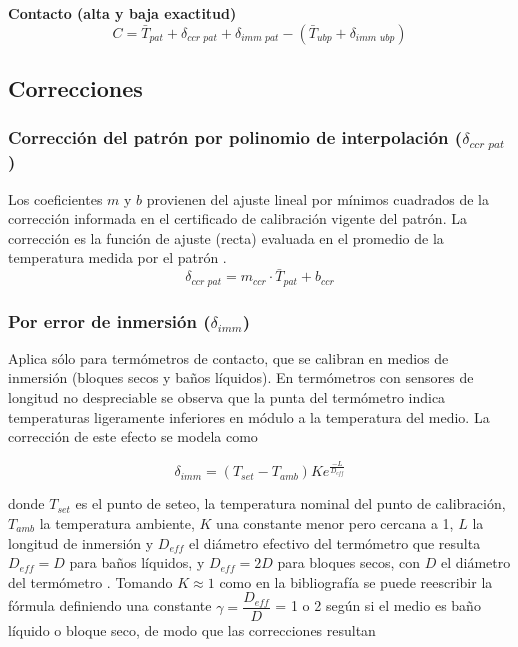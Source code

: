 \textbf{Contacto (alta y baja exactitud)}
\begin{equation}
    C = \bar{T}_{pat} + \delta_{\textit{ccr pat}} + \delta_{\textit{imm pat}} - (\bar{T}_{ubp} + \delta_{\textit{imm ubp}})
\end{equation}

\subsection{Correcciones}\label{sec:correcciones}

\subsubsection{Corrección del patrón por polinomio de interpolación ($\delta_{\textit{ccr pat}}$)}\label{sec:correccion-patron}

Los coeficientes $m$ y $b$ provienen del ajuste lineal por mínimos cuadrados de la corrección informada en el certificado de calibración vigente del patrón. La corrección es la función de ajuste (recta) evaluada en el promedio de la temperatura medida por el patrón \autocite{NW2.12,GUMH.3}.
\begin{equation}
    \delta_{\textit{ccr pat}} = m_{ccr}\cdot\bar{T}_{pat} + b_{ccr}
\end{equation}


\subsubsection{Por error de inmersión ($\delta_{\textit{imm}}$)}\label{sec:correccion-inmersion}
Aplica sólo para {termómetros de contacto}, que se calibran en medios de inmersión (bloques secos y baños líquidos). En termómetros con sensores de longitud no despreciable se observa que la punta del termómetro indica temperaturas ligeramente inferiores en módulo a la temperatura del medio. La corrección de este efecto se modela como

\begin{equation}
    \delta_{\textit{imm}} = (T_{set} - T_{amb})Ke^{\frac{-L}{D_{eff}}}
\end{equation}

donde $T_{set}$ es el punto de seteo, la temperatura nominal del punto de calibración, $T_{amb}$ la temperatura ambiente, $K$ una constante menor pero cercana a 1, $L$ la longitud de inmersión y $D_{eff}$ el diámetro efectivo del termómetro que resulta $D_{eff} = D$ para baños líquidos, y $D_{eff} = 2D$ para bloques secos, con $D$ el diámetro del termómetro \autocite{NW4.4.1,TAVENER}. Tomando $K \approx 1$ como en la bibliografía se puede reescribir la fórmula definiendo una constante $\gamma = \dfrac{D_{eff}}{D}$ = 1 o 2 según si el medio es baño líquido o bloque seco, de modo que las correcciones resultan

